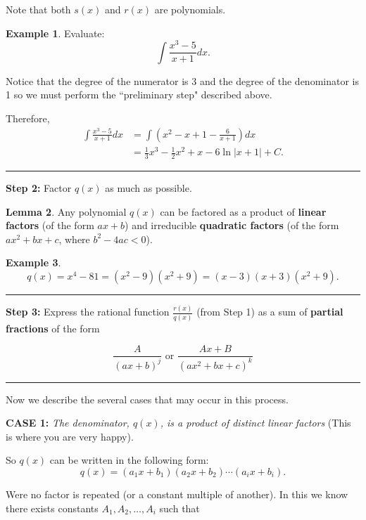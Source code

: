 \documentclass[reqno]{amsart}
\theoremstyle{definition}
\newtheorem{lem}{Lemma}[section]
\newtheorem{eg}[lem]{Example}
\numberwithin{equation}{section}
\begin{document}
Note that both $s(x)$ and $r(x)$ are polynomials.

\begin{eg} Evaluate: 
\[ \int \frac{x^3-5}{x+1} dx.\]

Notice that the degree of the numerator is 3 and the degree of the denominator is 1 so we must perform the ``preliminary step" described above.

\begin{center}
\end{center}

Therefore, 
\begin{align*}
\int \frac{x^3-5}{x+1} dx &= \int  \left(x^2-x+1 -\frac{6}{x+1}\right) dx \\
&= \frac{1}{3}x^3-\frac{1}{2}x^2+x-6\ln|x+1|+C.
\end{align*}
\end{eg}
\hrule
\vspace{1pc}

{\bf Step 2:} Factor $q(x)$ as much as possible.\\

\begin{lem}
Any polynomial $q(x)$ can be factored as a product of {\bf linear factors} (of the form $ax+b$) and irreducible {\bf quadratic factors} (of the form $ax^2+bx+c$, where $b^2-4ac <0$). 
\end{lem}

\begin{eg}
\[ q(x) = x^4 - 81 = (x^2-9)(x^2+9) = (x-3)(x+3)(x^2+9). \]
\end{eg}
\hrule
\vspace{1pc}

{\bf Step 3:} Express the rational function $\frac{r(x)}{q(x)}$ (from Step 1) as a sum of {\bf partial fractions} of the form

\[ \frac{A}{(ax+b)^j} \text{ or } \frac{Ax+B}{(ax^2+bx+c)^k} \]

\hrule
\vspace{1pc}

Now we describe the several cases that may occur in this process.


{\bf CASE 1:} {\it The denominator, $q(x)$, is a product of distinct linear factors} (This is where you are very happy).

So $q(x)$ can be written in the following form:
\[ q(x) = (a_1x+b_1)(a_2x+b_2)\cdots(a_ix+b_i). \]

Were no factor is repeated (or a constant multiple of another).  In this we know there exists constants $A_1,A_2,\ldots,A_i$ such that
\end{document}
